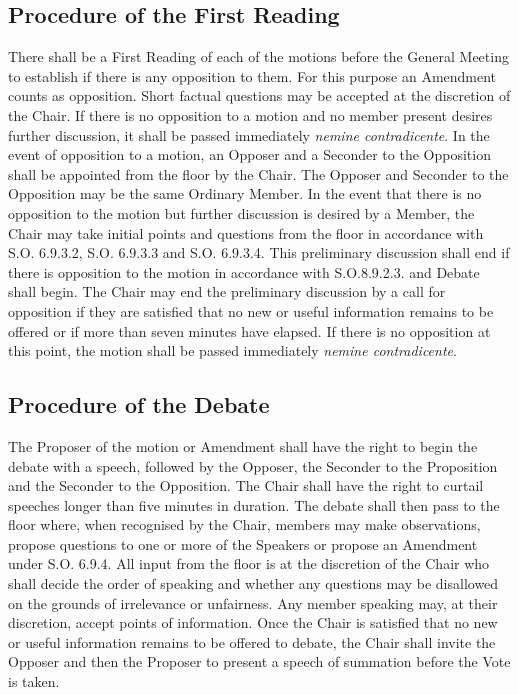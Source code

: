 \subsection{Procedure of the First Reading}
\npara There shall be a First Reading of each of the motions before the General Meeting to establish if there is any opposition to them. For this purpose an Amendment counts as opposition. Short factual questions may be accepted at the discretion of the Chair.
\npara If there is no opposition to a motion and no member present desires further discussion, it shall be passed immediately \textit{nemine contradicente}.
\npara In the event of opposition to a motion, an Opposer and a Seconder to the Opposition shall be appointed from the floor by the Chair.  The Opposer and Seconder to the Opposition may be the same Ordinary Member.
\npara In the event that there is no opposition to the motion but further discussion is desired by a Member, the Chair may take initial points and questions from the floor in accordance with S.O. 6.9.3.2, S.O. 6.9.3.3 and S.O. 6.9.3.4.
\npara This preliminary discussion shall end if there is opposition to the motion in accordance with S.O.8.9.2.3. and Debate shall begin.  
\npara The Chair may end the preliminary discussion by a call for opposition if they are satisfied that no new or useful information remains to be offered or if more than seven minutes have elapsed. If there is no opposition at this point, the motion shall be passed immediately \textit{nemine contradicente}.
\subsection{Procedure of the Debate}
\npara The Proposer of the motion or Amendment shall have the right to begin the debate with a speech, followed by the Opposer, the Seconder to the Proposition and the Seconder to the Opposition. The Chair shall have the right to curtail speeches longer than five minutes in duration.
\npara The debate shall then pass to the floor where, when recognised by the Chair, members may make observations, propose questions to one or more of the Speakers or propose an Amendment under S.O. 6.9.4.
\npara All input from the floor is at the discretion of the Chair who shall decide the order of speaking and whether any questions may be disallowed on the grounds of irrelevance or unfairness.
\npara Any member speaking may, at their discretion, accept points of information.
\npara Once the Chair is satisfied that no new or useful information remains to be offered to debate, the Chair shall invite the Opposer and then the Proposer to present a speech of summation before the Vote is taken.
